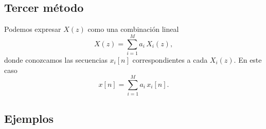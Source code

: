 \subsection{Tercer m\'{e}todo}

Podemos expresar $X(z)$ como una combinaci\'{o}n lineal
\begin{equation}
  X(z) = \sum_{i=1}^{M} a_{i} \, X_{i}(z),
\end{equation}
donde conozcamos las secuencias $x_{i}[n]$ correspondientes a cada $X_{i}(z)$. En este caso
\begin{equation}
  x[n] = \sum_{i=1}^{M} a_{i} \, x_{i}[n].
\end{equation}

\subsection{Ejemplos}

